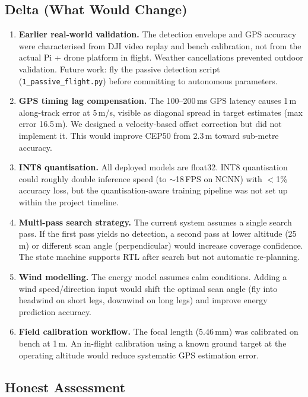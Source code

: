 \documentclass[10pt,a4paper]{article}
\begin{document}
\subsection{Delta (What Would Change)}

\begin{enumerate}[nosep]
  \item \textbf{Earlier real-world validation.} The detection envelope and GPS accuracy were characterised from DJI video replay and bench calibration, not from the actual Pi + drone platform in flight. Weather cancellations prevented outdoor validation. Future work: fly the passive detection script (\texttt{1\_passive\_flight.py}) before committing to autonomous parameters.
  \item \textbf{GPS timing lag compensation.} The 100--200\,ms GPS latency causes 1\,m along-track error at 5\,m/s, visible as diagonal spread in target estimates (max error 16.5\,m). We designed a velocity-based offset correction but did not implement it. This would improve CEP50 from 2.3\,m toward sub-metre accuracy.
  \item \textbf{INT8 quantisation.} All deployed models are float32. INT8 quantisation could roughly double inference speed (to $\sim$18\,FPS on NCNN) with $<$1\% accuracy loss, but the quantisation-aware training pipeline was not set up within the project timeline.
  \item \textbf{Multi-pass search strategy.} The current system assumes a single search pass. If the first pass yields no detection, a second pass at lower altitude (25\,m) or different scan angle (perpendicular) would increase coverage confidence. The state machine supports RTL after search but not automatic re-planning.
  \item \textbf{Wind modelling.} The energy model assumes calm conditions. Adding a wind speed/direction input would shift the optimal scan angle (fly into headwind on short legs, downwind on long legs) and improve energy prediction accuracy.
  \item \textbf{Field calibration workflow.} The focal length (5.46\,mm) was calibrated on bench at 1\,m. An in-flight calibration using a known ground target at the operating altitude would reduce systematic GPS estimation error.
\end{enumerate}

\subsection{Honest Assessment}
\end{document}
